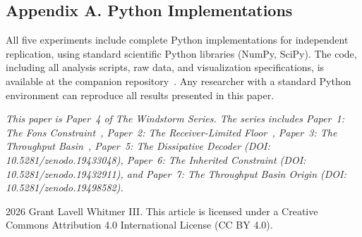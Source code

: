 \documentclass[12pt,a4paper]{article}
\begin{document}
\subsection*{Appendix A. Python Implementations}

All five experiments include complete Python implementations for independent replication, using standard scientific Python libraries (NumPy, SciPy). The code, including all analysis scripts, raw data, and visualization specifications, is available at the companion repository~\cite{whitmer2026code}. Any researcher with a standard Python environment can reproduce all results presented in this paper.

\bigskip
\noindent\emph{This paper is Paper~4 of The Windstorm Series. The series includes Paper~1: The Fons Constraint~\cite{whitmer2026fons}, Paper~2: The Receiver-Limited Floor~\cite{whitmer2026floor}, Paper~3: The Throughput Basin~\cite{whitmer2026basin}, Paper~5: The Dissipative Decoder (DOI: 10.5281/zenodo.19433048), Paper~6: The Inherited Constraint (DOI: 10.5281/zenodo.19432911), and Paper~7: The Throughput Basin Origin (DOI: 10.5281/zenodo.19498582).}

\bigskip
\noindent\textcopyright{} 2026 Grant Lavell Whitmer III. This article is licensed under a Creative Commons Attribution 4.0 International License (CC BY 4.0).
\end{document}
